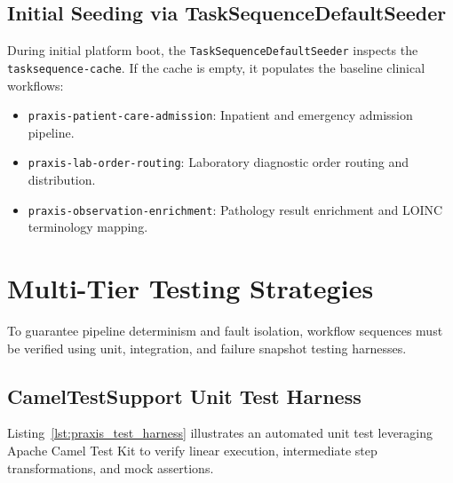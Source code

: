 \subsection{Initial Seeding via TaskSequenceDefaultSeeder}
\label{subsec:discovery_seeding}

During initial platform boot, the \texttt{TaskSequenceDefaultSeeder} inspects the \texttt{tasksequence-cache}. If the cache is empty, it populates the baseline clinical workflows:
\begin{itemize}
    \item \texttt{praxis-patient-care-admission}: Inpatient and emergency admission pipeline.
    \item \texttt{praxis-lab-order-routing}: Laboratory diagnostic order routing and distribution.
    \item \texttt{praxis-observation-enrichment}: Pathology result enrichment and LOINC terminology mapping.
\end{itemize}

\section{Multi-Tier Testing Strategies}
\label{sec:praxis_testing}

To guarantee pipeline determinism and fault isolation, workflow sequences must be verified using unit, integration, and failure snapshot testing harnesses.

\subsection{CamelTestSupport Unit Test Harness}
\label{subsec:testing_camel}

Listing~\ref{lst:praxis_test_harness} illustrates an automated unit test leveraging Apache Camel Test Kit to verify linear execution, intermediate step transformations, and mock assertions.

